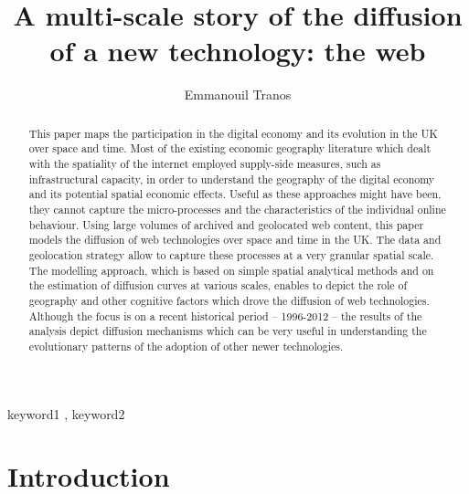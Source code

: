 \documentclass[
  authoryear,
  preprint,
  3p]{elsarticle}
\begin{document}
\begin{frontmatter}
\title{A multi-scale story of the diffusion of a new technology: the
web}
\author[1]{Emmanouil Tranos%
%
}



        
\begin{abstract}
This paper maps the participation in the digital economy and its
evolution in the UK over space and time. Most of the existing economic
geography literature which dealt with the spatiality of the internet
employed supply-side measures, such as infrastructural capacity, in
order to understand the geography of the digital economy and its
potential spatial economic effects. Useful as these approaches might
have been, they cannot capture the micro-processes and the
characteristics of the individual online behaviour. Using large volumes
of archived and geolocated web content, this paper models the diffusion
of web technologies over space and time in the UK. The data and
geolocation strategy allow to capture these processes at a very granular
spatial scale. The modelling approach, which is based on simple spatial
analytical methods and on the estimation of diffusion curves at various
scales, enables to depict the role of geography and other cognitive
factors which drove the diffusion of web technologies. Although the
focus is on a recent historical period -- 1996-2012 -- the results of
the analysis depict diffusion mechanisms which can be very useful in
understanding the evolutionary patterns of the adoption of other newer
technologies.
\end{abstract}





\begin{keyword}
    keyword1 \sep 
    keyword2
\end{keyword}
\end{frontmatter}
    
\section{Introduction}\label{sec1}
\end{document}
